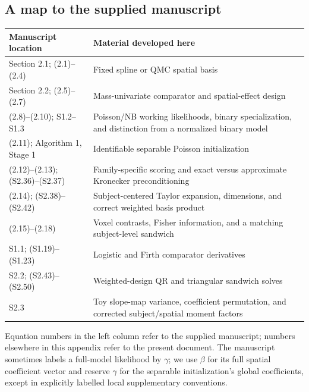 \documentclass[11pt,a4paper]{article}
\numberwithin{equation}{section}
\begin{document}
\subsection{A map to the supplied manuscript}
\begin{center}\small
\begin{tabularx}{\textwidth}{lT}
\toprule
Manuscript location & Material developed here\\
\midrule
Section 2.1; (2.1)--(2.4) & Fixed spline or QMC spatial basis\\
Section 2.2; (2.5)--(2.7) & Mass-univariate comparator and spatial-effect design\\
(2.8)--(2.10); S1.2--S1.3 & Poisson/NB working likelihoods, binary specialization,
and distinction from a normalized binary model\\
(2.11); Algorithm 1, Stage 1 & Identifiable separable Poisson initialization\\
(2.12)--(2.13); (S2.36)--(S2.37) & Family-specific scoring and exact versus
approximate Kronecker preconditioning\\
(2.14); (S2.38)--(S2.42) & Subject-centered Taylor expansion, dimensions,
and correct weighted basis product\\
(2.15)--(2.18) & Voxel contrasts, Fisher information, and a matching
subject-level sandwich\\
S1.1; (S1.19)--(S1.23) & Logistic and Firth comparator derivatives\\
S2.2; (S2.43)--(S2.50) & Weighted-design QR and triangular sandwich solves\\
S2.3 & Toy slope-map variance, coefficient permutation, and corrected
subject/spatial moment factors\\
\bottomrule
\end{tabularx}
\end{center}
Equation numbers in the left column refer to the supplied manuscript;
numbers elsewhere in this appendix refer to the present document.
The manuscript sometimes labels a full-model likelihood by $\gamma$;
we use $\beta$ for its full spatial coefficient vector and reserve
$\gamma$ for the separable initialization's global coefficients,
except in explicitly labelled local supplementary conventions.
\end{document}
